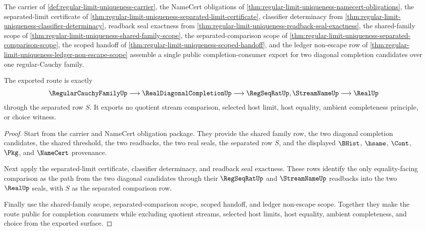 \begin{theorem}
\label{thm:regular-limit-uniqueness-public-completion-export}
The carrier of \autoref{def:regular-limit-uniqueness-carrier}, the NameCert obligations of \autoref{thm:regular-limit-uniqueness-namecert-obligations}, the separated-limit certificate of \autoref{thm:regular-limit-uniqueness-separated-limit-certificate}, classifier determinacy from \autoref{thm:regular-limit-uniqueness-classifier-determinacy}, readback seal exactness from \autoref{thm:regular-limit-uniqueness-readback-seal-exactness}, the shared-family scope of \autoref{thm:regular-limit-uniqueness-shared-family-scope}, the separated-comparison scope of \autoref{thm:regular-limit-uniqueness-separated-comparison-scope}, the scoped handoff of \autoref{thm:regular-limit-uniqueness-scoped-handoff}, and the ledger non-escape row of \autoref{thm:regular-limit-uniqueness-ledger-non-escape-scope} assemble a single public completion-consumer export for two diagonal completion candidates over one regular-Cauchy family.

The exported route is exactly
$$
\RegularCauchyFamilyUp \longrightarrow \RealDiagonalCompletionUp \longrightarrow \RegSeqRatUp,\StreamNameUp \longrightarrow \RealUp
$$
through the separated row $S$. It exports no quotient stream comparison, selected host limit, host equality, ambient completeness principle, or choice witness.
\end{theorem}
\begin{proof}
Start from the carrier and NameCert obligation package. They provide the shared family row, the two diagonal completion candidates, the shared threshold, the two readbacks, the two real seals, the separated row $S$, and the displayed $\BHist$, $\hsame$, $\Cont$, $\Pkg$, and $\NameCert$ provenance.

Next apply the separated-limit certificate, classifier determinacy, and readback seal exactness. These rows identify the only equality-facing comparison as the path from the two diagonal candidates through their $\RegSeqRatUp$ and $\StreamNameUp$ readbacks into the two $\RealUp$ seals, with $S$ as the separated comparison row.

Finally use the shared-family scope, separated-comparison scope, scoped handoff, and ledger non-escape scope. Together they make the route public for completion consumers while excluding quotient streams, selected host limits, host equality, ambient completeness, and choice from the exported surface.
\end{proof}

